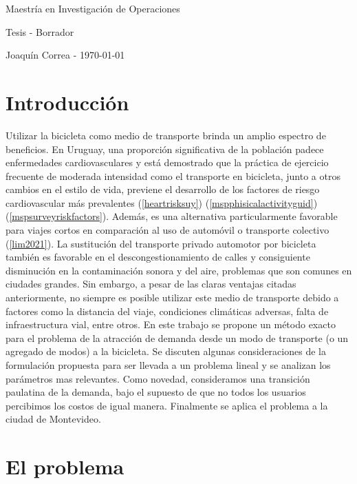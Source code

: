 \documentclass{article}
\begin{document}
  \begin{center}
    {\sc \large Maestría en Investigación de Operaciones}

    {\sc \large Tesis - Borrador}
    \linebreak

    {\rm Joaquín Correa - \today}
  \end{center}

  \tableofcontents

  \section*{Introducción}

  Utilizar la bicicleta como medio de transporte brinda un amplio espectro de beneficios. En Uruguay, una proporción significativa de la población padece enfermedades cardiovasculares y está demostrado que la práctica de ejercicio frecuente de moderada intensidad como el transporte en bicicleta, junto a otros cambios en el estilo de vida, previene el desarrollo de los factores de riesgo cardiovascular más prevalentes (\ref{heartrisksuy}) (\ref{mspphisicalactivityguid}) (\ref{mspsurveyriskfactors}). Además, es una alternativa particularmente favorable para viajes cortos en comparación al uso de automóvil o transporte colectivo (\ref{lim2021}). La sustitución del transporte privado automotor por bicicleta también es favorable en el descongestionamiento de calles y consiguiente disminución en la contaminación sonora y del aire, problemas que son comunes en ciudades grandes. Sin embargo, a pesar de las claras ventajas citadas anteriormente, no siempre es posible utilizar este medio de transporte debido a factores como la distancia del viaje, condiciones climáticas adversas, falta de infraestructura vial, entre otros. En este trabajo se propone un método exacto para el problema de la atracción de demanda desde un modo de transporte (o un agregado de modos) a la bicicleta. Se discuten algunas consideraciones de la formulación propuesta para ser llevada a un problema lineal y se analizan los parámetros mas relevantes. Como novedad, consideramos una transición paulatina de la demanda, bajo el supuesto de que no todos los usuarios percibimos los costos de igual manera. Finalmente se aplica el problema a la ciudad de Montevideo.

  \section{El problema}
\end{document}

